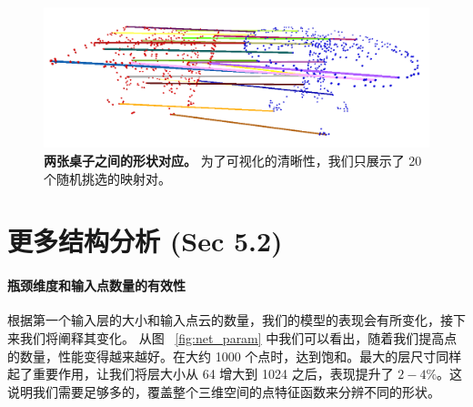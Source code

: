 \begin{figure}[h]
    \centering
    \includegraphics[width=\linewidth]{fig/table_corr.png}
    \caption{\textbf{两张桌子之间的形状对应。} 为了可视化的清晰性，我们只展示了 20 个随机挑选的映射对。}
    \label{fig:table_corr}
\end{figure}


\section{更多结构分析 (Sec 5.2)}
\label{sec:architecture}

\paragraph{瓶颈维度和输入点数量的有效性}

根据第一个输入层的大小和输入点云的数量，我们的模型的表现会有所变化，接下来我们将阐释其变化。 从图 ~\ref{fig:net_param} 中我们可以看出，随着我们提高点的数量，性能变得越来越好。在大约 1000 个点时，达到饱和。最大的层尺寸同样起了重要作用，让我们将层大小从 64 增大到 1024 之后，表现提升了 $2-4\%$。这说明我们需要足够多的，覆盖整个三维空间的点特征函数来分辨不同的形状。




